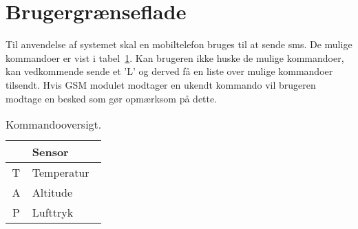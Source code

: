 \section{Brugergrænseflade}

Til anvendelse af systemet skal en mobiltelefon bruges til at sende sms. De mulige kommandoer er vist i tabel~\ref{tab:commands}. Kan brugeren ikke huske de mulige kommandoer, kan vedkommende sende et 'L' og derved få en liste over mulige kommandoer tilsendt. Hvis GSM modulet modtager en ukendt kommando vil brugeren modtage en besked som gør opmærksom på dette.

\begin{table}[h]
	\centering
	\begin{tabular}{|c|l|}
		\hline
		\rowcolor[HTML]{EFEFEF} 
		\multicolumn{1}{|l|}{\cellcolor[HTML]{EFEFEF}\textbf{SMS}} & \textbf{Sensor}	\\ \hline
		T & Temperatur	\\ \hline
		A & Altitude	\\ \hline
		P & Lufttryk	\\ \hline
	\end{tabular}
	\caption{Kommandooversigt.}
	\label{tab:commands}
\end{table}



